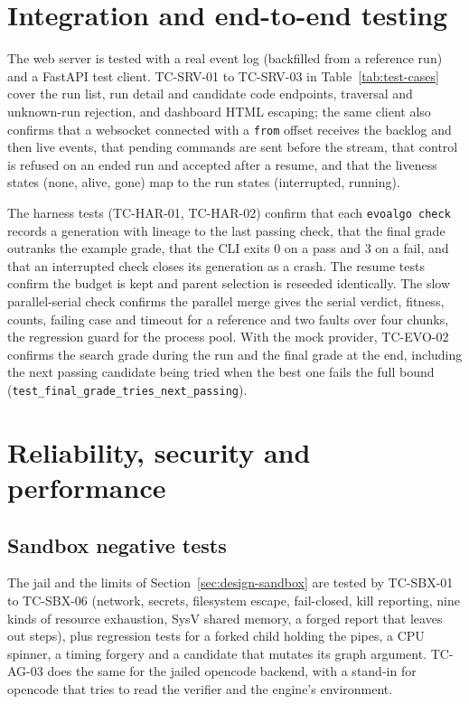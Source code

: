 \section{Integration and end-to-end testing}
\label{sec:test-integration}

The web server is tested with a real event log (backfilled from a reference
run) and a FastAPI test client. TC-SRV-01 to TC-SRV-03 in
Table~\ref{tab:test-cases} cover the run list, run detail and candidate code
endpoints, traversal and unknown-run rejection, and dashboard HTML escaping;
the same client also confirms that a websocket connected with a \texttt{from}
offset receives the backlog and then live events, that pending commands are
sent before the stream, that control is refused on an ended run and accepted
after a resume, and that the liveness states (none, alive, gone) map to the
run states (interrupted, running).

The harness tests (TC-HAR-01, TC-HAR-02) confirm that each \texttt{evoalgo
check} records a generation with lineage to the last passing check, that the
final grade outranks the example grade, that the CLI exits 0 on a pass and 3 on a
fail, and that an interrupted check closes its generation as a crash. The resume
tests confirm the budget is kept and parent selection is reseeded identically.
The slow parallel-serial check confirms the parallel merge gives the serial
verdict, fitness, counts, failing case and timeout for a reference and two
faults over four chunks, the regression guard for the process pool. With the
mock provider, TC-EVO-02 confirms the search grade during the run and the final
grade at the end, including the next passing candidate being tried when the best
one fails the full bound (\texttt{test\_final\_grade\_tries\_next\_passing}).

\section{Reliability, security and performance}
\label{sec:test-reliability}

\subsection{Sandbox negative tests}

The jail and the limits of Section~\ref{sec:design-sandbox} are tested by
TC-SBX-01 to TC-SBX-06 (network, secrets, filesystem escape, fail-closed, kill
reporting, nine kinds of resource exhaustion, SysV shared memory, a forged report
that leaves out steps), plus regression tests for a forked child holding the
pipes, a CPU spinner, a timing forgery and a candidate that mutates its graph
argument. TC-AG-03 does the same for the jailed opencode backend, with a stand-in
for opencode that tries to read the verifier and the engine's environment.

